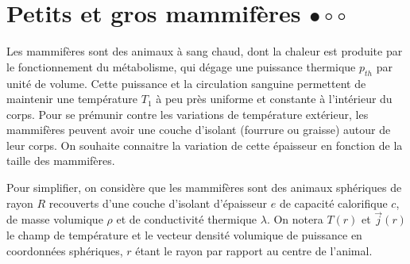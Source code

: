 \documentclass{report}
\begin{document}
\section*{Petits et gros mammifères $\bullet\circ\circ$}

Les mammifères sont des animaux à sang chaud, dont la chaleur est produite par le fonctionnement du métabolisme, qui dégage une puissance thermique $p_{th}$ par unité de volume. Cette puissance et la circulation sanguine permettent de maintenir une température $T_1$ à peu près uniforme et constante à l'intérieur du corps. Pour se prémunir contre les variations de température extérieur, les mammifères peuvent avoir une couche d'isolant (fourrure ou graisse) autour de leur corps. On souhaite connaitre la variation de cette épaisseur en fonction de la taille des mammifères. 

Pour simplifier, on considère que les mammifères sont des animaux sphériques de rayon $R$ recouverts d'une couche d'isolant d'épaisseur $e$ de capacité calorifique $c$, de masse volumique $\rho$ et de conductivité thermique $\lambda$. On notera $T(r)$ et $\vec{j}(r)$ le champ de température et le vecteur densité volumique de puissance en coordonnées sphériques, $r$ étant le rayon par rapport au centre de l'animal.
\end{document}
